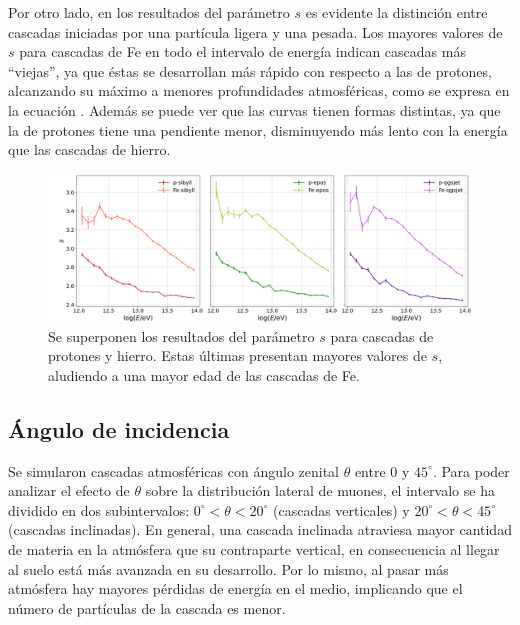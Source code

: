 \documentclass[12pt,letterpaper]{report}
\begin{document}
	Por otro lado, en los resultados del par\'ametro $s$ es evidente la distinci\'on entre cascadas iniciadas por una part\'icula ligera y una pesada. Los mayores valores de $s$ para cascadas de Fe en todo el intervalo de energ\'ia indican cascadas m\'as ``viejas'', ya que \'estas se desarrollan m\'as r\'apido con respecto a las de protones, alcanzando su m\'aximo a menores profundidades atmosf\'ericas, como se expresa en la ecuaci\'on . Adem\'as se puede ver que las curvas tienen formas distintas, ya que la de protones tiene una pendiente menor, disminuyendo m\'as lento con la energ\'ia que las cascadas de hierro. \\
		\begin{figure} []
		\includegraphics[width=\textwidth]{Figuras/composition_nkgs}
		\caption{Se superponen los resultados del par\'ametro $s$ para cascadas de protones y hierro. Estas \'ultimas presentan mayores valores de $s$, aludiendo a una mayor edad de las cascadas de Fe.}
		\label{fig:composition_nkgs}
		\end{figure}	
	
			
	\subsection{\'Angulo de incidencia}
	Se simularon cascadas atmosf\'ericas con \'angulo zenital $\theta$ entre $0$ y $45^{\circ}$. Para poder analizar el efecto de $\theta$ sobre la distribuci\'on lateral de muones, el intervalo se ha dividido en dos subintervalos: $0^{\circ}<\theta<20^{\circ}$ (cascadas verticales) y $20^{\circ}<\theta<45^{\circ}$ (cascadas inclinadas). En general, una cascada inclinada atraviesa mayor cantidad de materia en la atm\'osfera que su contraparte vertical, en consecuencia al llegar al suelo est\'a m\'as avanzada en su desarrollo. Por lo mismo, al pasar m\'as atm\'osfera hay mayores p\'erdidas de energ\'ia en el medio, implicando que el n\'umero de part\'iculas de la cascada es menor. \\
	
\end{document}
